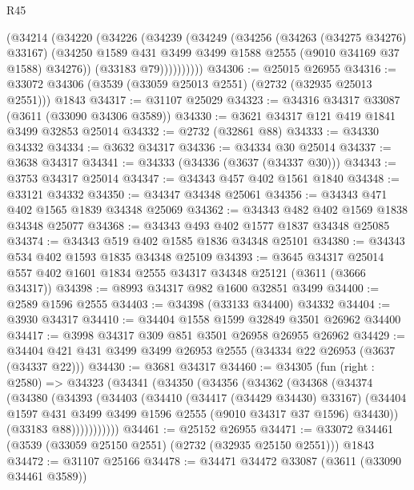 \begin{lexlean}{R45}
\begin{coremodule}
            (@34214
              (@34220
                (@34226
                  (@34239
                    (@34249
                      (@34256
                        (@34263 (@34275 @34276) @33167)
                        (@34250 @1589 @431 @3499 @3499 @1588 @2555 (@9010 @34169 @37 @1588) @34276))
                      (@33183 @79))))))))))
@34306 := @25015 @26955
@34316 := @33072 @34306 (@3539 (@33059 @25013 @2551) (@2732 (@32935 @25013 @2551))) @1843
@34317 := @31107 @25029
@34323 := @34316 @34317 @33087 (@3611 (@33090 @34306 @3589))
@34330 := @3621 @34317 @121 @419 @1841 @3499 @32853 @25014
@34332 := @2732 (@32861 @88)
@34333 := @34330 @34332
@34334 := @3632 @34317
@34336 := @34334 @30 @25014
@34337 := @3638 @34317
@34341 := @34333 (@34336 (@3637 (@34337 @30)))
@34343 := @3753 @34317 @25014
@34347 := @34343 @457 @402 @1561 @1840
@34348 := @33121 @34332
@34350 := @34347 @34348 @25061
@34356 := @34343 @471 @402 @1565 @1839 @34348 @25069
@34362 := @34343 @482 @402 @1569 @1838 @34348 @25077
@34368 := @34343 @493 @402 @1577 @1837 @34348 @25085
@34374 := @34343 @519 @402 @1585 @1836 @34348 @25101
@34380 := @34343 @534 @402 @1593 @1835 @34348 @25109
@34393 := @3645
    @34317
    @25014
    @557
    @402
    @1601
    @1834
    @2555
    @34317
    @34348
    @25121
    (@3611 (@3666 @34317))
@34398 := @8993 @34317 @982 @1600 @32851 @3499
@34400 := @2589 @1596 @2555
@34403 := @34398 (@33133 @34400) @34332
@34404 := @3930 @34317
@34410 := @34404 @1558 @1599 @32849 @3501 @26962 @34400
@34417 := @3998 @34317 @309 @851 @3501 @26958 @26955 @26962
@34429 := @34404 @421 @431 @3499 @3499 @26953 @2555 (@34334 @22 @26953 (@3637 (@34337 @22)))
@34430 := @3681 @34317
@34460 := @34305
    (fun (right : @2580) =>
    @34323
      (@34341
        (@34350
          (@34356
            (@34362
              (@34368
                (@34374
                  (@34380
                    (@34393
                      (@34403
                        (@34410
                          (@34417 (@34429 @34430) @33167)
                          (@34404
                            @1597
                            @431
                            @3499
                            @3499
                            @1596
                            @2555
                            (@9010 @34317 @37 @1596)
                            @34430))
                        (@33183 @88)))))))))))
@34461 := @25152 @26955
@34471 := @33072 @34461 (@3539 (@33059 @25150 @2551) (@2732 (@32935 @25150 @2551))) @1843
@34472 := @31107 @25166
@34478 := @34471 @34472 @33087 (@3611 (@33090 @34461 @3589))

\end{coremodule}
\end{lexlean}
